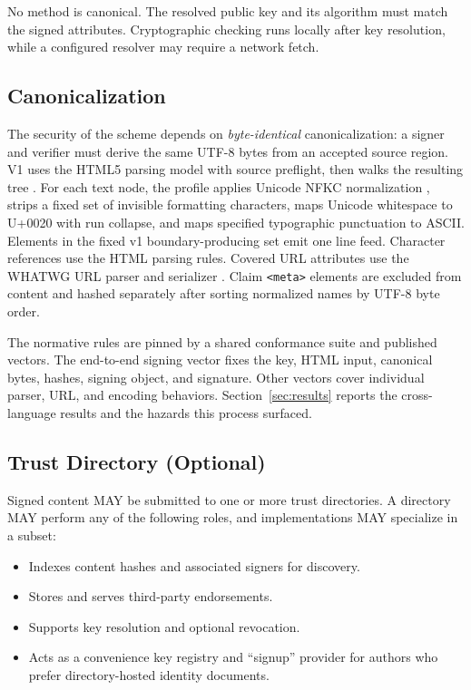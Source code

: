 \documentclass{article}
\begin{document}
No method is canonical. The resolved public key and its algorithm must match the signed attributes. Cryptographic checking runs locally after key resolution, while a configured resolver may require a network fetch.

\subsection{Canonicalization}
\label{sec:canon}
The security of the scheme depends on \emph{byte-identical} canonicalization: a signer and verifier must derive the same UTF-8 bytes from an accepted source region. V1 uses the HTML5 parsing model with source preflight, then walks the resulting tree \cite{WHATWGHTML}. For each text node, the profile applies Unicode NFKC normalization \cite{UnicodeNormalization}, strips a fixed set of invisible formatting characters, maps Unicode whitespace to U+0020 with run collapse, and maps specified typographic punctuation to ASCII. Elements in the fixed v1 boundary-producing set emit one line feed. Character references use the HTML parsing rules. Covered URL attributes use the WHATWG URL parser and serializer \cite{WHATWGURL}. Claim \texttt{<meta>} elements are excluded from content and hashed separately after sorting normalized names by UTF-8 byte order.

The normative rules are pinned by a shared conformance suite and published vectors. The end-to-end signing vector fixes the key, HTML input, canonical bytes, hashes, signing object, and signature. Other vectors cover individual parser, URL, and encoding behaviors. Section~\ref{sec:results} reports the cross-language results and the hazards this process surfaced.

\subsection{Trust Directory (Optional)}
Signed content MAY be submitted to one or more trust directories. A directory MAY perform any of the following roles, and implementations MAY specialize in a subset:
\begin{itemize}
  \item Indexes content hashes and associated signers for discovery.
  \item Stores and serves third-party endorsements.
  \item Supports key resolution and optional revocation.
  \item Acts as a convenience key registry and ``signup'' provider for authors who prefer directory-hosted identity documents.
\end{itemize}
\end{document}

